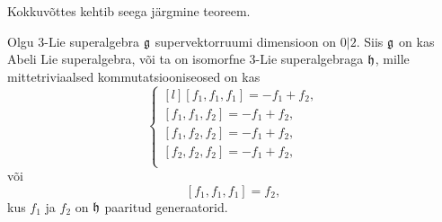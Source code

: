 Kokkuvõttes kehtib seega järgmine teoreem.
\begin{thm}
    Olgu $3$-Lie superalgebra $\mathfrak{g}$ supervektorruumi dimensioon on $0|2$.
    Siis $\mathfrak{g}$ on kas Abeli Lie superalgebra, või ta on isomorfne $3$-Lie
    superalgebraga $\mathfrak{h}$, mille mittetriviaalsed kommutatsiooniseosed on kas
    \[ \left\{
        \begin{matrix*}[l]
            [f_1, f_1, f_1] = -f_1 + f_2, \\
            [f_1, f_1, f_2] = -f_1 + f_2, \\
            [f_1, f_2, f_2] = -f_1 + f_2, \\
            [f_2, f_2, f_2] = -f_1 + f_2, \\
        \end{matrix*}
    \right. \]
    või
    \[
        [f_1, f_1, f_1] = f_2,
    \]
    kus $f_1$ ja $f_2$ on $\mathfrak{h}$ paaritud generaatorid.
\end{thm}

